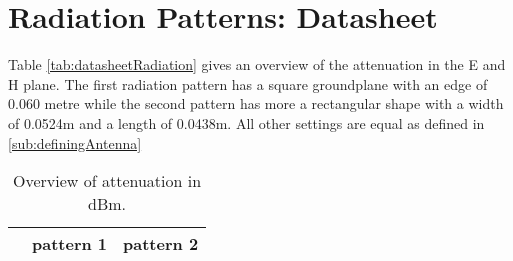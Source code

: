\chapter{Radiation Patterns: Datasheet}
\label{ch:radpattern}
Table \ref{tab:datasheetRadiation} gives an overview of the attenuation in the E and H plane. The first radiation pattern 
 has a square groundplane with an edge of 0.060 metre while the second pattern 
 has more a rectangular shape with a width of 0.0524m and a length of 0.0438m.
All other settings are equal as defined in \ref{sub:definingAntenna}
\begin{table*}[!ht]
\centering
\caption{Overview of attenuation in dBm.}
\begin{tabular}{|l|l|l|l|l|}
\hline
 & \multicolumn{2}{c|}{pattern 1} & \multicolumn{2}{|c|}{pattern 2}\\\hline


\end{tabular}
\end{table*}
